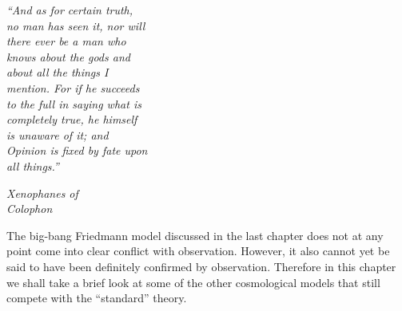 
\begin{flushleft}
\begin{minipage}{0.38\textwidth}
\raggedright
\itshape
``And as for certain truth,\\
no man has seen it, nor will\\
there ever be a man who\\
knows about the gods and\\
about all the things I\\
mention. For if he succeeds\\
to the full in saying what is\\
completely true, he himself\\
is unaware of it; and\\
Opinion is fixed by fate upon\\
all things.''\par
\medskip
\normalfont\itshape Xenophanes of\\
Colophon
\end{minipage}
\end{flushleft}

\bigskip

The big-bang Friedmann model discussed in the last chapter does not at any
point come into clear conflict with observation. However, it also cannot yet be
said to have been definitely confirmed by observation. Therefore in this
chapter we shall take a brief look at some of the other cosmological models
that still compete with the ``standard'' theory.

